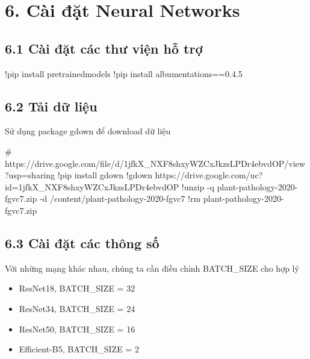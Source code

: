 \documentclass{article}
\begin{document}
	\section{6. Cài đặt Neural Networks}
	\subsection{6.1 Cài đặt các thư viện hỗ trợ}
	\begin{python}
		!pip install pretrainedmodels
		!pip install albumentations==0.4.5
	\end{python}
	\subsection{6.2 Tải dữ liệu}
	Sử dụng package gdown để download dữ liệu 
	\begin{python}
		# https://drive.google.com/file/d/1jfkX_NXF8shxyWZCxJkzsLPDr4ebvdOP/view?usp=sharing
		!pip install gdown
		!gdown https://drive.google.com/uc?id=1jfkX_NXF8shxyWZCxJkzsLPDr4ebvdOP
		!unzip -q plant-pathology-2020-fgvc7.zip -d /content/plant-pathology-2020-fgvc7
		!rm plant-pathology-2020-fgvc7.zip
	\end{python}
	\subsection{6.3 Cài đặt các thông số}
	Với những mạng khác nhau, chúng ta cần điều chỉnh BATCH\_SIZE cho hợp lý
	\begin{itemize}
		\item ResNet18, BATCH\_SIZE = 32
		\item ResNet34, BATCH\_SIZE = 24
		\item ResNet50, BATCH\_SIZE = 16
		\item Efficient-B5, BATCH\_SIZE = 2
	\end{itemize}
\end{document}
